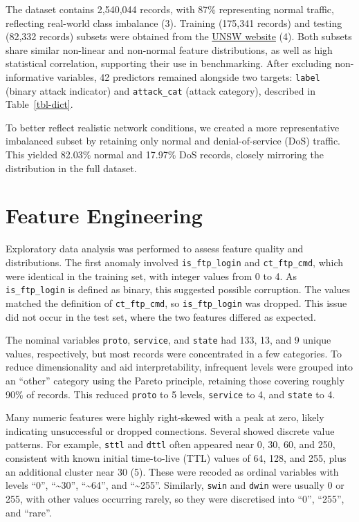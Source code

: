 \documentclass[
  a4paper,
]{scrreprt}
\begin{document}
The dataset contains 2,540,044 records, with 87\% representing normal
traffic, reflecting real-world class imbalance (3). Training (175,341
records) and testing (82,332 records) subsets were obtained from the
\href{https://research.unsw.edu.au/projects/unsw-nb15-dataset}{UNSW
website} (4). Both subsets share similar non-linear and non-normal
feature distributions, as well as high statistical correlation,
supporting their use in benchmarking. After excluding non-informative
variables, 42 predictors remained alongside two targets: \texttt{label}
(binary attack indicator) and \texttt{attack\_cat} (attack category),
described in Table~\ref{tbl-dict}.

To better reflect realistic network conditions, we created a more
representative imbalanced subset by retaining only normal and
denial-of-service (DoS) traffic. This yielded 82.03\% normal and 17.97\%
DoS records, closely mirroring the distribution in the full dataset.

\section{Feature Engineering}\label{feature-engineering}

Exploratory data analysis was performed to assess feature quality and
distributions. The first anomaly involved \texttt{is\_ftp\_login} and
\texttt{ct\_ftp\_cmd}, which were identical in the training set, with
integer values from 0 to 4. As \texttt{is\_ftp\_login} is defined as
binary, this suggested possible corruption. The values matched the
definition of \texttt{ct\_ftp\_cmd}, so \texttt{is\_ftp\_login} was
dropped. This issue did not occur in the test set, where the two
features differed as expected.

The nominal variables \texttt{proto}, \texttt{service}, and
\texttt{state} had 133, 13, and 9 unique values, respectively, but most
records were concentrated in a few categories. To reduce dimensionality
and aid interpretability, infrequent levels were grouped into an
``other'' category using the Pareto principle, retaining those covering
roughly 90\% of records. This reduced \texttt{proto} to 5 levels,
\texttt{service} to 4, and \texttt{state} to 4.

Many numeric features were highly right-skewed with a peak at zero,
likely indicating unsuccessful or dropped connections. Several showed
discrete value patterns. For example, \texttt{sttl} and \texttt{dttl}
often appeared near 0, 30, 60, and 250, consistent with known initial
time-to-live (TTL) values of 64, 128, and 255, plus an additional
cluster near 30 (5). These were recoded as ordinal variables with levels
``0'', ``\textasciitilde30'', ``\textasciitilde64'', and
``\textasciitilde255''. Similarly, \texttt{swin} and \texttt{dwin} were
usually 0 or 255, with other values occurring rarely, so they were
discretised into ``0'', ``255'', and ``rare''.
\end{document}
